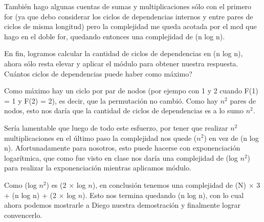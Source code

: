 	También hago algunas cuentas de sumas y multiplicaciones sólo con el primero for (ya que debo considerar los ciclos de dependencias internos y entre pares de ciclos de misma longitud) pero la complejidad me queda acotada por el mcd que hago en el doble for, quedando entonces una complejidad de \bigo(n log n). \newline

	En fin, logramos calcular la cantidad de ciclos de dependencias en \bigo(n log n), ahora sólo resta elevar y aplicar el módulo para obtener nuestra respuesta. Cuántos ciclos de dependencias puede haber como máximo? \newline

	Como máximo hay un ciclo por par de nodos (por ejempo con 1 y 2 cuando F(1) = 1 y F(2) = 2), es decir, que la permutación no cambió. Como hay $n^2$ pares de nodos, esto nos daría que la cantidad de ciclos de dependencias es a lo sumo $n^2$. \newline

	Sería lamentable que luego de todo este esfuerzo, por tener que realizar $n^2$ multiplicaciones en el último paso la complejidad nos quede \bigo($n^2$) en vez de \bigo(n log n). Afortunadamente para nosotros, esto puede hacerse con exponenciación logarítmica, que como fue visto en clase nos daría una complejidad de \bigo(log $n^2$) para realizar la exponenciación mientras aplicamos módulo. \newline

	Como \bigo(log $n^2$) es \bigo(2 $\times$ log $n$), en conclusión tenemos una complejidad de \bigo(N) $\times$ 3 + \bigo(n log n) + \bigo(2 $\times$ log $n$). Esto nos termina quedando \bigo(n log n), con lo cual ahora podemos mostrarle a Diego nuestra demostración y finalmente lograr convencerlo.